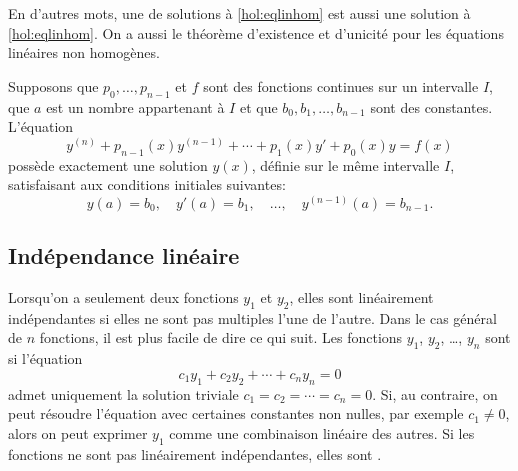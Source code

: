 En d'autres mots, une \emph{} de solutions à \eqref{hol:eqlinhom}
est aussi une solution à \eqref{hol:eqlinhom}.
On a aussi le théorème d'existence et d'unicité pour les équations linéaires non homogènes. 

\begin{theorem}
	Supposons que $p_0,\ldots, p_{n-1}$ et $f$ sont des fonctions continues sur un intervalle $I$,
	que $a$ est un nombre appartenant à $I$
	et que $b_0, b_1, \ldots, b_{n-1}$ sont des constantes.
	L'équation  
	\begin{equation*} %
		y^{(n)} + p_{n-1}(x)y^{(n-1)} + \cdots + p_1(x) y' + p_0(x) y = f(x) 
	\end{equation*}
	possède exactement une solution $y(x)$, définie sur le même intervalle $I$, 
	satisfaisant aux conditions initiales suivantes: 
	\begin{equation*}
		y(a) = b_0, \quad y'(a) = b_1, \quad \ldots, \quad y^{(n-1)}(a) = b_{n-1} .
	\end{equation*}
\end{theorem}




\subsection{Indépendance linéaire}

Lorsqu'on a seulement deux fonctions $y_1$ et $y_2$, elles sont linéairement indépendantes si elles ne sont pas multiples l'une de l'autre. Dans le cas général de $n$ fonctions, il est plus facile de dire ce qui suit. 
Les fonctions  $y_1$, $y_2$, \ldots, $y_n$ sont \emph{} si l'équation
\begin{equation*}
	c_1 y_1 + c_2 y_2 + \cdots + c_n y_n = 0 
\end{equation*}
admet uniquement la solution triviale $c_1 = c_2 = \cdots = c_n = 0$.  
Si, au contraire, on peut résoudre l'équation avec certaines constantes non nulles, par exemple  $c_1 \not= 0$, alors on peut exprimer $y_1$ comme une combinaison linéaire des autres. 
Si les fonctions ne sont pas linéairement indépendantes, elles sont  \emph{}.

